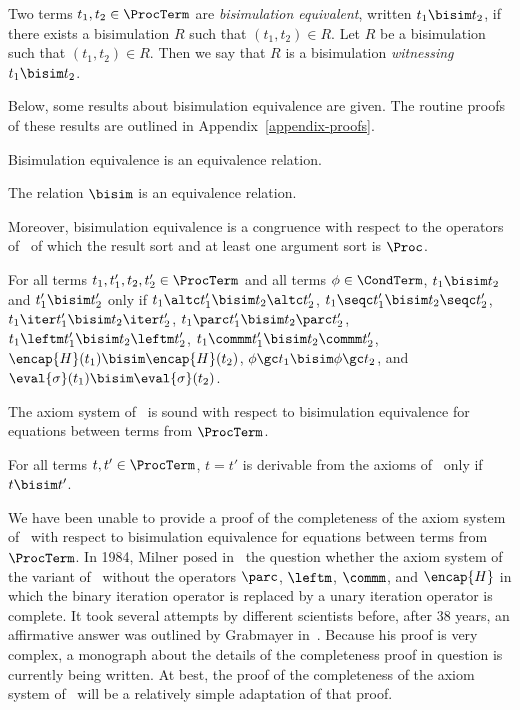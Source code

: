 \documentclass[runningheads]{llncs}
\begin{document}
Two terms $t_1,t_2 \in \ProcTerm$ are \emph{bisimulation equivalent}, 
written $t_1 \bisim t_2$, if there exists a bisimulation $R$ such that 
$(t_1,t_2) \in R$.
%
Let $R$ be a bisimulation such that $(t_1,t_2) \in R$.
Then we say that $R$ is a bisimulation \emph{witnessing}
$t_1 \bisim t_2$.

Below, some results about bisimulation equivalence are given.
The routine proofs of these results are outlined in 
Appendix~\ref{appendix-proofs}.

Bisimulation equivalence is an equivalence relation.%
%
\begin{proposition}[Equivalence]
\label{proposition-equiv-deACPei}
The relation $\bisim$ is an equivalence relation. 
\end{proposition}
%
Moreover, bisimulation equivalence is a congruence with respect to the 
operators of \deACPei\ of which the result sort and at least one 
argument sort is $\Proc$.
%
\begin{proposition}[Congruence]
\label{proposition-congr-deACPei}
For all terms $t_1,t_1',t_2,t_2' \in \ProcTerm$ and all terms 
$\phi \in \CondTerm$, 
$t_1 \bisim t_2$ and $t_1' \bisim t_2'$ only if 
$t_1 \altc t_1' \bisim t_2 \altc t_2'$, 
$t_1 \seqc t_1' \bisim t_2 \seqc t_2'$, 
$t_1 \iter t_1' \bisim t_2 \iter t_2'$, 
$t_1 \parc t_1' \bisim t_2 \parc t_2'$, 
$t_1 \leftm t_1' \bisim t_2 \leftm t_2'$,
$t_1 \commm t_1' \bisim t_2 \commm t_2'$,
$\encap{H}(t_1) \bisim \encap{H}(t_2)$, 
$\phi \gc t_1 \bisim \phi \gc t_2$, and
$\eval{\sigma}(t_1) \bisim \eval{\sigma}(t_2)$.
\end{proposition}

The axiom system of \deACPei\ is sound with respect to bisimulation 
equivalence for equations between terms from $\ProcTerm$.
%
\begin{theorem}[Soundness]
\label{theorem-soundness-deACPei}
For all terms $t,t' \in \ProcTerm$, $t = t'$ is derivable from the 
axioms of \deACPei\ only if $t \bisim t'$.
\end{theorem}

We have been unable to provide a proof of the completeness of the axiom
system of \deACPei\ with respect to bisimulation equivalence for 
equations between terms from $\ProcTerm$.
In 1984, Milner posed in~\cite{Mil84a} the question whether the axiom 
system of the variant of \ACPei\ without the operators $\parc$, 
$\leftm$, $\commm$, and $\encap{H}$ in which the binary iteration 
operator is replaced by a unary iteration operator is complete.
It took several attempts by different scientists before, after 38 years, 
an affirmative answer was outlined by Grabmayer in~\cite{Grab22a}.
Because his proof is very complex, a monograph about the details of the 
completeness proof in question is currently being written.  
At best, the proof of the completeness of the axiom system of \deACPei\ 
will be a relatively simple adaptation of that proof.
\end{document}

